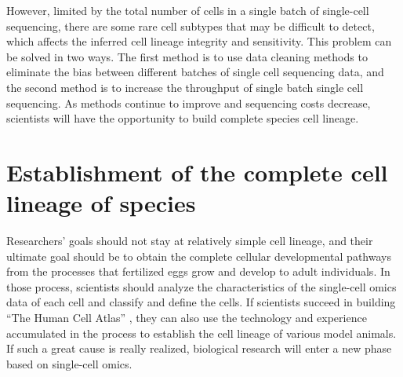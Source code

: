 However, limited by the total number of cells in a single batch of single-cell sequencing, there are some rare cell subtypes that may be difficult to detect, which affects the inferred cell lineage integrity and sensitivity. This problem can be solved in two ways. The first method is to use data cleaning methods to eliminate the bias between different batches of single cell sequencing data, and the second method is to increase the throughput of single batch single cell sequencing. As methods continue to improve and sequencing costs decrease, scientists will have the opportunity to build complete species cell lineage.

\section{Establishment of the complete cell lineage of species}

Researchers' goals should not stay at relatively simple cell lineage, and their ultimate goal should be to obtain the complete cellular developmental pathways from the processes that fertilized eggs grow and develop to adult individuals. In those process, scientists should analyze the characteristics of the single-cell omics data of each cell and classify and define the cells. If scientists succeed in building ``The Human Cell Atlas'' \parencite{regev_human_2017}, they can also use the technology and experience accumulated in the process to establish the cell lineage of various model animals. If such a great cause is really realized, biological research will enter a new phase based on single-cell omics.
















